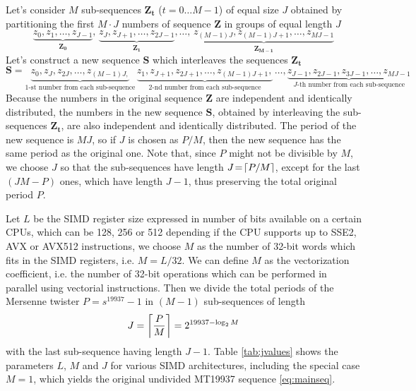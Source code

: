 \documentclass[preprint,1p,times]{elsarticle}
\begin{document}
	Let's consider $M$ sub-sequences $\boldsymbol{Z_t}$ ($t=0\dots M-1$) of equal size $J$ obtained by partitioning the first $M\cdot J$ numbers of sequence $\boldsymbol{Z}$ in groups of equal length $J$
	\begin{equation}
		\label{eq:subseq}
		\underbrace{z_0, z_1, \dots, z_{J-1}}_{\boldsymbol{Z_0}},\, \underbrace{z_J, z_{J+1}, \dots, z_{2J-1}}_{\boldsymbol{Z_1}}, \dots,\, \underbrace{z_{(M-1)J}, z_{(M-1)J+1}, \dots, z_{MJ-1}}_{\boldsymbol{Z_{M-1}}}
	\end{equation}
	Let's construct a new sequence $\boldsymbol{S}$ which interleaves the sequences $\boldsymbol{Z_t}$
	\begin{equation}
		\label{eq:combseq}
		\boldsymbol{S}=\underbrace{z_0, z_J, z_{2J}, \dots, z_{(M-1)J,}}_{\text{1-st number from each sub-sequence}} \,\underbrace{z_1, z_{J+1}, z_{2J+1}, \dots, z_{(M-1)J+1},}_{\text{2-nd number from each sub-sequence}}\, \dots, \underbrace{z_{J-1}, z_{2J-1}, z_{3J-1}, \dots, z_{MJ-1}}_{\text{$J$-th number from each sub-sequence}}
	\end{equation}
	Because the numbers in the original sequence $\boldsymbol{Z}$ are independent and identically distributed, the numbers in the new sequence $\boldsymbol{S}$, obtained by interleaving the sub-sequences $\boldsymbol{Z_t}$, are also independent and identically distributed. The period of the new sequence is $MJ$, so if $J$ is chosen as $P/M$, then the new sequence has the same period as the original one. Note that, since $P$ might not be divisible by $M$, we choose $J$ so that the sub-sequences have length $J\!=\!\left\lceil{P/M}\right\rceil$, except for the last  $(JM\!-\!P)$ ones, which have length $J\!-\!1$, thus preserving the total original period $P$. 
	
	Let $L$ be the SIMD register size expressed in number of bits available on a certain CPUs, which can be 128, 256 or 512 depending if the CPU supports up to SSE2, AVX or AVX512 instructions, we choose $M$ as the number of 32-bit words which fits in the SIMD registers, i.e. $M=L/32$.
	We can define $M$ as the vectorization coefficient, i.e. the number of 32-bit operations which can be performed in parallel using vectorial instructions.
	Then we divide the total periods of the Mersenne twister $P=s^{19937}\!-\!1$ in $(M\!-\!1)$ sub-sequences of length
	$$J=\left\lceil{\frac{P}{M}}\right\rceil=2^{19937-\log_2M}$$
	with the last sub-sequence having length $J\!-\!1$. Table \ref{tab:jvalues} shows the parameters $L$, $M$ and $J$ for various SIMD architectures, including the special case $M\!=\!1$, which yields the original undivided MT19937 sequence \eqref{eq:mainseq}.
	
\end{document}
